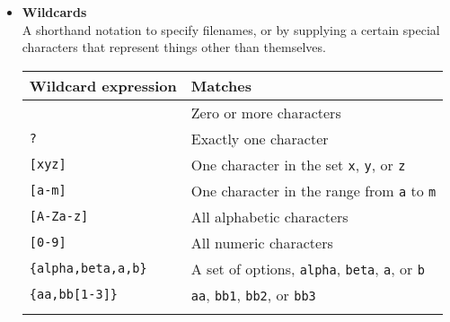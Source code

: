 \begin{itemize}
\item {\bf\label{sc4_gl_wild}Wildcards}\\
      A shorthand notation to specify filenames,
       or  by supplying a certain special
      characters that represent things other than themselves.
      \medskip


      \begin{tabular}{lp{100mm}}
      Wildcard expression & Matches \\ \hline
      {\tt *} & Zero or more characters \\
      {\tt ?} & Exactly one character \\
      {\tt [xyz]} & One character in the set {\tt x}, {\tt y}, or {\tt z} \\
      {\tt [a-m]} & One character in the range from {\tt a} to {\tt m} \\
      {\tt [A-Za-z]} & All alphabetic characters \\
      {\tt [0-9]} & All numeric characters \\
      {\tt \{alpha,beta,a,b\}} & A set of options, {\tt alpha}, {\tt beta}, {\tt a}, or {\tt b} \\
      {\tt \{aa,bb[1-3]\}} & {\tt aa}, {\tt bb1}, {\tt bb2}, or {\tt bb3} \\
      \\ \hline
      \end{tabular}


\end{itemize}


